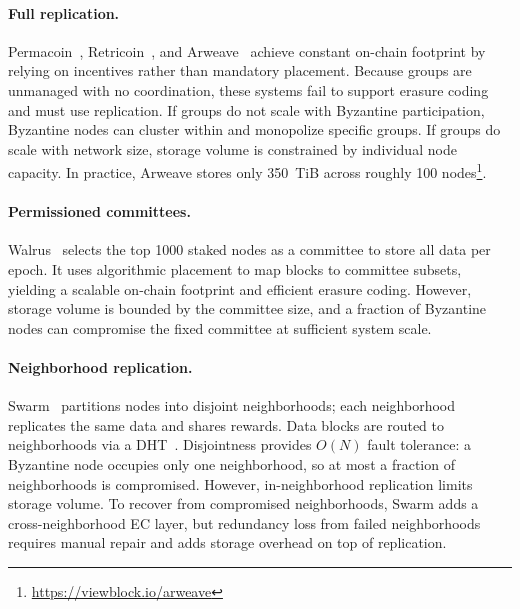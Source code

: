 \paragraph{Full replication.}
Permacoin~\cite{permacoin}, Retricoin~\cite{retricoin}, and Arweave~\cite{arweave} achieve constant on-chain footprint by relying on incentives rather than mandatory placement.
Because groups are unmanaged with no coordination, these systems fail to support erasure coding and must use replication.
If groups do not scale with Byzantine participation, Byzantine nodes can cluster within and monopolize specific groups.
If groups do scale with network size, storage volume is constrained by individual node capacity.
In practice, Arweave stores only 350~TiB across roughly 100 nodes\footnote{\url{https://viewblock.io/arweave}}.

\paragraph{Permissioned committees.}
Walrus~\cite{walrus} selects the top 1000 staked nodes as a committee to store all data per epoch.
It uses algorithmic placement to map blocks to committee subsets, yielding a scalable on-chain footprint and efficient erasure coding.
However, storage volume is bounded by the committee size, and a fraction of Byzantine nodes can compromise the fixed committee at sufficient system scale.

\paragraph{Neighborhood replication.}
Swarm~\cite{swarm} partitions nodes into disjoint neighborhoods; each neighborhood replicates the same data and shares rewards.
Data blocks are routed to neighborhoods via a DHT~\cite{chord,kademlia}.
Disjointness provides $O(N)$ fault tolerance: a Byzantine node occupies only one neighborhood, so at most a fraction of neighborhoods is compromised.
However, in-neighborhood replication limits storage volume.
To recover from compromised neighborhoods, Swarm adds a cross-neighborhood EC layer, but redundancy loss from failed neighborhoods requires manual repair and adds storage overhead on top of replication.
